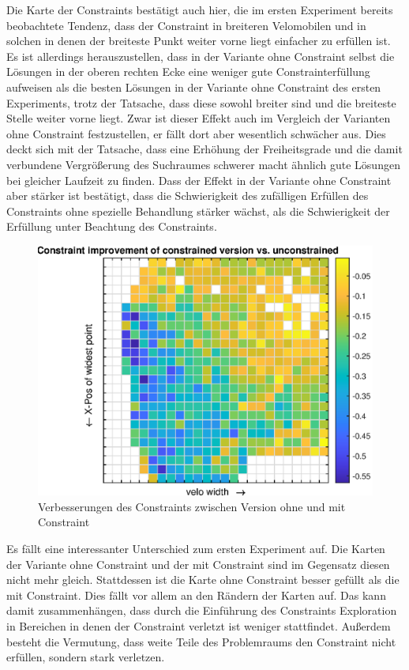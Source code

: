 Die Karte der Constraints bestätigt auch hier, die im ersten Experiment bereits beobachtete Tendenz, dass der Constraint in breiteren Velomobilen und in solchen in denen der breiteste Punkt weiter vorne liegt einfacher zu erfüllen ist.
Es ist allerdings herauszustellen, dass in der Variante ohne Constraint selbst die Lösungen in der oberen rechten Ecke eine weniger gute Constrainterfüllung aufweisen als die besten Lösungen in der Variante ohne Constraint des ersten Experiments, trotz der Tatsache, dass diese sowohl breiter sind und die breiteste Stelle weiter vorne liegt.
Zwar ist dieser Effekt auch im Vergleich der Varianten ohne Constraint festzustellen, er fällt dort aber wesentlich schwächer aus.
Dies deckt sich mit der Tatsache, dass eine Erhöhung der Freiheitsgrade und die damit verbundene Vergrößerung des Suchraumes schwerer macht ähnlich gute Lösungen bei gleicher Laufzeit zu finden.
Dass der Effekt in der Variante ohne Constraint aber stärker ist bestätigt, dass die Schwierigkeit des zufälligen Erfüllen des Constraints ohne spezielle Behandlung stärker wächst, als die Schwierigkeit der Erfüllung unter Beachtung des Constraints.

\begin{figure}[h]
	\centering
	\includegraphics[width=.7\linewidth]{bilder/6pt500Samples/constraintImprovements}
	\caption{Verbesserungen des Constraints zwischen Version ohne und mit Constraint}
	\label{fig:2ndmapConCompare}
\end{figure}

Es fällt eine interessanter Unterschied zum ersten Experiment auf.
Die Karten der Variante ohne Constraint und der mit Constraint sind im Gegensatz diesen nicht mehr gleich.
Stattdessen ist die Karte ohne Constraint besser gefüllt als die mit Constraint.
Dies fällt vor allem an den Rändern der Karten auf.
Das kann damit zusammenhängen, dass durch die Einführung des Constraints Exploration in Bereichen in denen der Constraint verletzt ist weniger stattfindet.
Außerdem besteht die Vermutung, dass weite Teile des Problemraums den Constraint nicht erfüllen, sondern stark verletzen.

